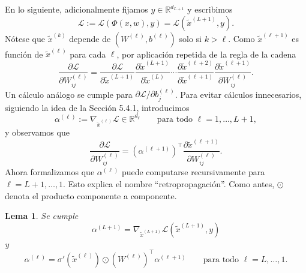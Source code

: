 \documentclass[11pt]{report}
\newenvironment{tcolorbox}[1][]{\par\medskip\noindent\ignorespaces}{\par\medskip}
\theoremstyle{definition}
\theoremstyle{plain}
\newtheorem{lema}[definicion]{Lema}
\numberwithin{equation}{section}
\begin{document}
En lo siguiente, adicionalmente fijamos \(y\in\mathbb{R}^{d_{L+1}}\) y escribimos
\begin{equation*}
    \mathcal{L}:=\mathcal{L}(\Phi(x,w),y)
    =
    \mathcal{L}(\widetilde{x}^{(L+1)},y).
\end{equation*}
Nótese que \(\widetilde{x}^{(k)}\) depende de \((W^{(\ell)},b^{(\ell)})\) solo si \(k>\ell\). Como \(\widetilde{x}^{(\ell+1)}\) es función de \(\widetilde{x}^{(\ell)}\) para cada \(\ell\), por aplicación repetida de la regla de la cadena
\begin{equation*}
    \frac{\partial\mathcal{L}}{\partial W_{ij}^{(\ell)}}
    =
    \frac{\partial\mathcal{L}}{\partial \widetilde{x}^{(L+1)}}
    \frac{\partial \widetilde{x}^{(L+1)}}{\partial \widetilde{x}^{(L)}}
    \cdots
    \frac{\partial \widetilde{x}^{(\ell+2)}}{\partial \widetilde{x}^{(\ell+1)}}
    \frac{\partial \widetilde{x}^{(\ell+1)}}{\partial W_{ij}^{(\ell)}}.
    \tag{5.4.7}
\end{equation*}
Un cálculo análogo se cumple para \(\partial\mathcal{L}/\partial b_j^{(\ell)}\). Para evitar cálculos innecesarios, siguiendo la idea de la Sección 5.4.1, introducimos
\begin{equation*}
    \alpha^{(\ell)}
    :=
    \nabla_{\widetilde{x}^{(\ell)}}\mathcal{L}
    \in\mathbb{R}^{d_\ell}
    \qquad
    \text{para todo } \ell=1,\ldots,L+1,
    \tag{5.4.8}
\end{equation*}
y observamos que
\begin{equation*}
    \frac{\partial\mathcal{L}}{\partial W_{ij}^{(\ell)}}
    =
    (\alpha^{(\ell+1)})^\top
    \frac{\partial \widetilde{x}^{(\ell+1)}}{\partial W_{ij}^{(\ell)}}.
\end{equation*}
Ahora formalizamos que \(\alpha^{(\ell)}\) puede computarse recursivamente para \(\ell=L+1,\ldots,1\). Esto explica el nombre ``retropropagación''. Como antes, \(\odot\) denota el producto componente a componente.

\begin{tcolorbox}[colback=blue!8, colframe=blue!8, boxrule=0pt]
\begin{lema}
Se cumple
\begin{equation*}
    \alpha^{(L+1)}
    =
    \nabla_{\widetilde{x}^{(L+1)}}\mathcal{L}(\widetilde{x}^{(L+1)},y)
    \tag{5.4.9}
\end{equation*}
y
\begin{equation*}
    \alpha^{(\ell)}
    =
    \sigma'(\widetilde{x}^{(\ell)})
    \odot
    (W^{(\ell)})^\top\alpha^{(\ell+1)}
    \qquad
    \text{para todo } \ell=L,\ldots,1.
    \tag{5.4.10}
\end{equation*}
\end{lema}
\end{tcolorbox}
\end{document}
